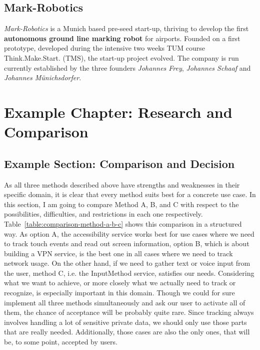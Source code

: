 \section{Mark-Robotics}
\label{sec:mark-robotics}

\emph{Mark-Robotics} is a Munich based pre-seed start-up, thriving to develop the first \textbf{autonomous ground line marking robot} for airports. Founded on a first prototype, developed during the intensive two weeks TUM course Think.Make.Start. (TMS), the start-up project evolved. The company is run currently established by the three founders \emph{Johannes Frey}, \emph{Johannes Schaaf} and \emph{Johannes Münichsdorfer}.

\chapter{Example Chapter: Research and Comparison}

\section{Example Section: Comparison and Decision}
\label{sec:comparison}

As all three methods described above have strengths and weaknesses in their specific domain, it is clear that every method suits best for a concrete use case. In this section, I am going to compare Method A, B, and C with respect to the possibilities, difficulties, and restrictions in each one respectively. Table~\ref{table:comparison-method-a-b-c} shows this comparison in a structured way. As option A, the accessibility service works best for use cases where we need to track touch events and read out screen information, option B, which is about building a VPN service, is the best one in all cases where we need to track network usage. On the other hand, if we need to gather text or voice input from the user, method C, i.e. the InputMethod service, satisfies our needs. Considering what we want to achieve, or more closely what we actually need to track or recognize, is especially important in this domain. Though we could for sure implement all three methods simultaneously and ask our user to activate all of them, the chance of acceptance will be probably quite rare. Since tracking always involves handling a lot of sensitive private data, we should only use those parts that are really needed. Additionally, those cases are also the only ones, that will be, to some point, accepted by users.

